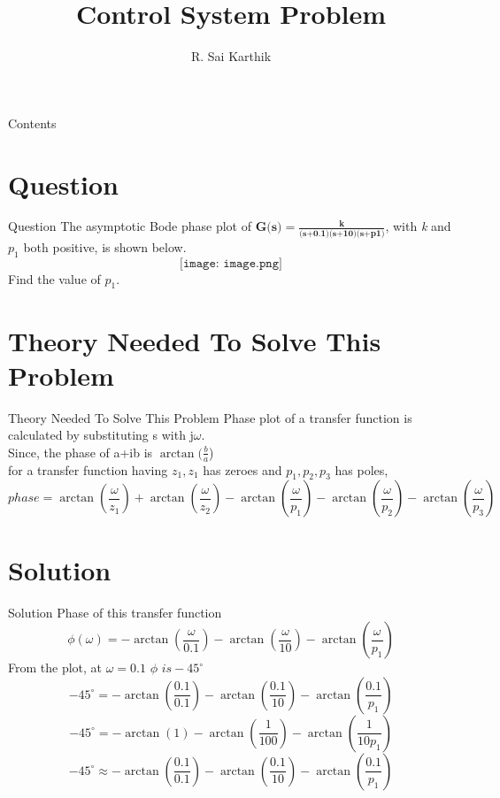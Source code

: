 \documentclass{beamer}
\title{Control System Problem}
\author{R. Sai Karthik}
\institute{IIT Hyderabad}
\begin{document}
\begin{frame}
\titlepage    
\end{frame}
\begin{frame}{Contents}
\tableofcontents
\end{frame}
\section{Question}
\begin{frame}{Question}
The asymptotic Bode phase plot of $\textbf{G(s)}=\frac{\textbf{k}}{\textbf{(s+0.1)}\textbf{(s+10)}\textbf{(s+p1)}}$, with \textit{k} and \textit{$p_1$} both positive, is shown below.
\[\texttt{[image: image.png]}\]
Find the value of \textit{$p_1$}.
\end{frame}


\section{Theory Needed To Solve This Problem}
\begin{frame}{Theory Needed To Solve This Problem}
Phase plot of a transfer function is calculated by substituting s with j$\omega$.
\\
Since, the phase of a+ib is $\arctan(\frac{b}{a}$)
\\
for a transfer function having $z_1,z_1$ has zeroes and $p_1,p_2,p_3$ has poles,
\[phase = \arctan(\frac{\omega}{z_1})+\arctan(\frac{\omega}{z_2})-\arctan(\frac{\omega}{p_1})-\arctan(\frac{\omega}{p_2})-\arctan(\frac{\omega}{p_3}) \]

\end{frame}




\section{Solution}
\begin{frame}{Solution}
Phase of this transfer function
\\
\[\phi(\omega) = -\arctan(\frac{\omega}{0.1}) -\arctan(\frac{\omega}{10}) -\arctan(\frac{\omega}{p_1})\]
From the plot, at $\omega = 0.1$ $\phi$  $is -45^{\circ}$
\[ -45^{\circ} = -\arctan(\frac{0.1}{0.1}) -\arctan(\frac{0.1}{10}) -\arctan(\frac{0.1}{p_1})\]
\[ -45^{\circ} = -\arctan(1) -\arctan(\frac{1}{100}) -\arctan(\frac{1}{10p_1})\]
\[ -45^{\circ} \approx -\arctan(\frac{0.1}{0.1}) -\arctan(\frac{0.1}{10}) -\arctan(\frac{0.1}{p_1})\]

\end{frame}
\end{document}
